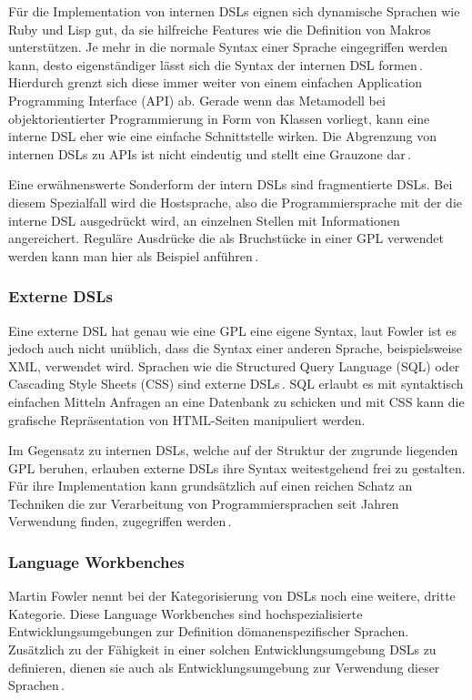 \documentclass[12pt,oneside,a4paper,parskip]{scrbook}
\begin{document}
Für die Implementation von internen DSLs eignen sich dynamische Sprachen wie Ruby und Lisp gut, da sie hilfreiche Features wie die Definition von Makros unterstützen. Je mehr in die normale Syntax einer Sprache eingegriffen werden kann, desto eigenständiger lässt sich die Syntax der internen DSL formen\,\cite[S. 98]{stahl2007}. Hierdurch grenzt sich diese immer weiter von einem einfachen Application Programming Interface (API) ab. Gerade wenn das Metamodell bei objektorientierter Programmierung in Form von Klassen vorliegt, kann eine interne DSL eher wie eine einfache Schnittstelle wirken. Die Abgrenzung von internen DSLs zu APIs ist nicht eindeutig und stellt eine Grauzone dar\,\cite[S. 67]{fowler2010}.

Eine erwähnenswerte Sonderform der intern DSLs sind fragmentierte DSLs. Bei diesem Spezialfall wird die Hostsprache, also die Programmiersprache mit der die interne DSL ausgedrückt wird, an einzelnen Stellen mit Informationen angereichert. Reguläre Ausdrücke die als Bruchstücke in einer GPL verwendet werden kann man hier als Beispiel anführen\,\cite[S. 32]{fowler2010}.

\subsubsection{Externe DSLs}

Eine externe DSL hat genau wie eine GPL eine eigene Syntax, laut Fowler ist es jedoch auch nicht unüblich, dass die Syntax einer anderen Sprache, beispielsweise XML,  verwendet wird. Sprachen wie die Structured Query Language (SQL) oder Cascading Style Sheets (CSS) sind externe DSLs\,\cite[S. 28]{fowler2010}. SQL erlaubt es mit syntaktisch einfachen Mitteln Anfragen an eine Datenbank zu schicken und mit CSS kann die grafische Repräsentation von HTML-Seiten manipuliert werden.

Im Gegensatz zu internen DSLs, welche auf der Struktur der zugrunde liegenden GPL beruhen, erlauben externe DSLs ihre Syntax weitestgehend frei zu gestalten. Für ihre Implementation kann grundsätzlich auf einen reichen Schatz an Techniken die zur Verarbeitung von Programmiersprachen seit Jahren Verwendung finden, zugegriffen werden\,\cite[S. 89]{fowler2010}.

\subsubsection{Language Workbenches}

Martin Fowler nennt bei der Kategorisierung von DSLs noch eine weitere, dritte Kategorie. Diese Language Workbenches sind hochspezialisierte Entwicklungsumgebungen zur Definition dömanenspezifischer Sprachen. Zusätzlich zu der Fähigkeit in einer solchen Entwicklungsumgebung DSLs zu definieren, dienen sie auch als Entwicklungsumgebung zur Verwendung dieser Sprachen\,\cite[S.28]{fowler2010}.
\end{document}
